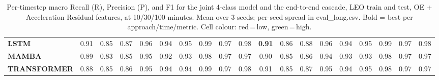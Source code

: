 \begin{table}[t]
{\begin{tabular}{l ccc ccc ccc ccc ccc ccc}
\textbf{LSTM} & \cellcolor[HTML]{51CF66}0.91 & \cellcolor[HTML]{51CF66}0.85 & \cellcolor[HTML]{51CF66}0.87 & \cellcolor[HTML]{51CF66}0.96 & \cellcolor[HTML]{51CF66}0.94 & \cellcolor[HTML]{51CF66}0.95 & \cellcolor[HTML]{51CF66}0.99 & \cellcolor[HTML]{51CF66}0.97 & \cellcolor[HTML]{51CF66}0.98 & \cellcolor[HTML]{51CF66}\textbf{0.91} & \cellcolor[HTML]{51CF66}0.86 & \cellcolor[HTML]{51CF66}0.88 & \cellcolor[HTML]{51CF66}0.96 & \cellcolor[HTML]{51CF66}0.94 & \cellcolor[HTML]{51CF66}0.95 & \cellcolor[HTML]{51CF66}0.99 & \cellcolor[HTML]{51CF66}0.97 & \cellcolor[HTML]{51CF66}0.98 \\
\textbf{MAMBA} & \cellcolor[HTML]{51CF66}0.89 & \cellcolor[HTML]{51CF66}0.83 & \cellcolor[HTML]{51CF66}0.85 & \cellcolor[HTML]{51CF66}0.95 & \cellcolor[HTML]{51CF66}0.92 & \cellcolor[HTML]{51CF66}0.93 & \cellcolor[HTML]{51CF66}0.98 & \cellcolor[HTML]{51CF66}0.97 & \cellcolor[HTML]{51CF66}0.97 & \cellcolor[HTML]{51CF66}0.90 & \cellcolor[HTML]{51CF66}0.85 & \cellcolor[HTML]{51CF66}0.86 & \cellcolor[HTML]{51CF66}0.94 & \cellcolor[HTML]{51CF66}0.93 & \cellcolor[HTML]{51CF66}0.93 & \cellcolor[HTML]{51CF66}0.98 & \cellcolor[HTML]{51CF66}0.97 & \cellcolor[HTML]{51CF66}0.97 \\
\textbf{TRANSFORMER} & \cellcolor[HTML]{51CF66}0.88 & \cellcolor[HTML]{51CF66}0.85 & \cellcolor[HTML]{51CF66}0.86 & \cellcolor[HTML]{51CF66}0.95 & \cellcolor[HTML]{51CF66}0.94 & \cellcolor[HTML]{51CF66}0.94 & \cellcolor[HTML]{51CF66}0.99 & \cellcolor[HTML]{51CF66}0.97 & \cellcolor[HTML]{51CF66}0.98 & \cellcolor[HTML]{51CF66}0.91 & \cellcolor[HTML]{51CF66}0.85 & \cellcolor[HTML]{51CF66}0.87 & \cellcolor[HTML]{51CF66}0.95 & \cellcolor[HTML]{51CF66}0.94 & \cellcolor[HTML]{51CF66}0.95 & \cellcolor[HTML]{51CF66}0.98 & \cellcolor[HTML]{51CF66}0.97 & \cellcolor[HTML]{51CF66}0.97 \\
\bottomrule
\end{tabular}%
}
\caption{Per-timestep macro Recall (R), Precision (P), and F1 for the joint 4-class model and the end-to-end cascade, LEO train and test, OE + Acceleration Residual features, at 10/30/100 minutes. Mean over 3 seeds; per-seed spread in eval\_long.csv. Bold = best per approach/time/metric. Cell colour: red\,=\,low, green\,=\,high.}
\label{tab:seq_leo_ladder_jc}
\end{table}
